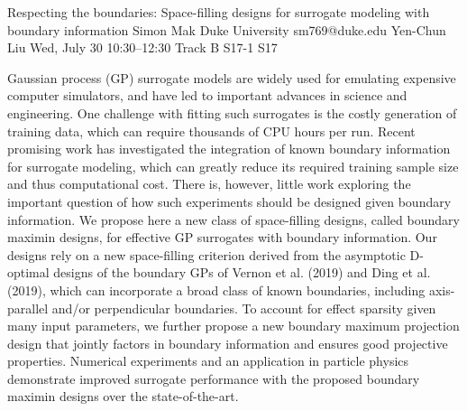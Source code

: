 \begin{talk}
  {Respecting the boundaries: Space-filling designs for surrogate modeling with boundary information}%
  {Simon Mak}%
  {Duke University}%
  {sm769@duke.edu}%
  {Yen-Chun Liu}%
  {}%
  {Wed, July 30 10:30–12:30 Track B}%
  {S17-1}%
  {S17}%
  
				
			
Gaussian process (GP) surrogate models are widely used for emulating expensive computer simulators, and have led to important advances in science and engineering. One challenge with fitting such surrogates is the costly generation of training data, which can require thousands of CPU hours per run. Recent promising work has investigated the integration of known boundary information for surrogate modeling, which can greatly reduce its required training sample size and thus computational cost. There is, however, little work exploring the important question of how such experiments should be designed given boundary information. We propose here a new class of space-filling designs, called boundary maximin designs, for effective GP surrogates with boundary information. Our designs rely on a new space-filling criterion derived from the asymptotic D-optimal designs of the boundary GPs of Vernon et al. (2019) and Ding et al. (2019), which can incorporate a broad class of known boundaries, including axis-parallel and/or perpendicular boundaries. To account for effect sparsity given many input parameters, we further propose a new boundary maximum projection design that jointly factors in boundary information and ensures good projective properties. Numerical experiments and an application in particle physics demonstrate improved surrogate performance with the proposed boundary maximin designs over the state-of-the-art.
\medskip


\end{talk}

